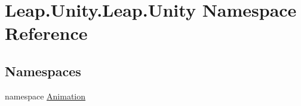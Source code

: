\hypertarget{namespace_leap_1_1_unity_1_1_leap_1_1_unity}{}\section{Leap.\+Unity.\+Leap.\+Unity Namespace Reference}
\label{namespace_leap_1_1_unity_1_1_leap_1_1_unity}
\subsection*{Namespaces}
\begin{DoxyCompactItemize}
\item 
namespace \mbox{\hyperlink{namespace_leap_1_1_unity_1_1_leap_1_1_unity_1_1_animation}{Animation}}
\end{DoxyCompactItemize}
